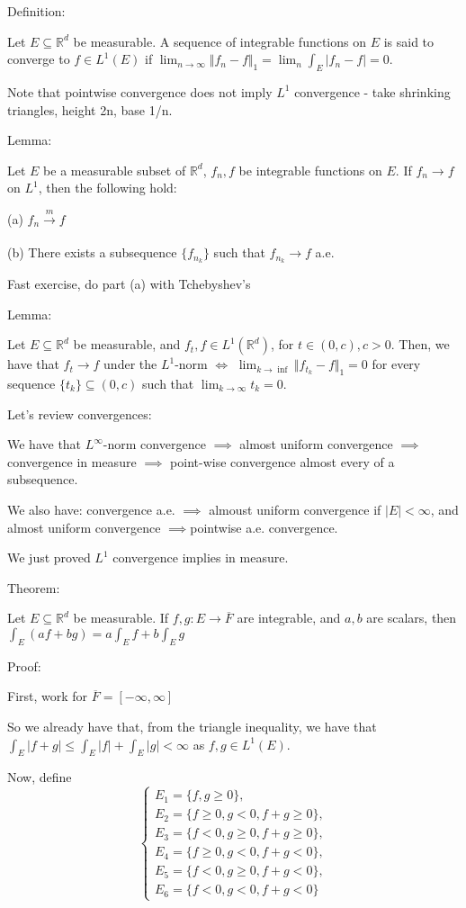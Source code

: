 \documentclass[10pt]{article}
\begin{document}
Definition:

Let $E \subseteq \mathbb{R}^d$ be measurable. A sequence of integrable functions on $E$ is said to converge to $f \in L^1(E)$ if $\lim_{n \to \infty} \Vert f_n -f \Vert_1 = \lim_n \int_E |f_n - f| = 0$.

Note that pointwise convergence does not imply $L^1$ convergence - take shrinking triangles, height 2n, base 1/n.

Lemma:

Let $E$ be a measurable subset of $\mathbb{R}^d$, $f_n,f$ be integrable functions on $E$. If $f_n \to f$ on $L^1$, then the following hold:

(a) $f_n \xrightarrow[]{m} f$

(b) There exists a subsequence $\{ f_{n_k} \}$ such that $f_{n_k} \to f$ a.e.

Fast exercise, do part (a) with Tchebyshev’s

Lemma:

Let $E \subseteq \mathbb{R}^d$ be measurable, and $f_t, f \in L^1(\mathbb{R}^d)$, for $t \in (0,c), c > 0$. Then, we have that $f_t \to f$ under the $L^1$-norm $\iff$ $\lim_{k\to\inf} \Vert f_{t_k} - f \Vert_1 = 0$ for every sequence $\{ t_k \} \subseteq (0,c)$ such that $\lim_{k \to \infty} t_k = 0$.

Let’s review convergences:

We have that $L^\infty$-norm convergence $\implies$ almost uniform convergence $\implies$ convergence in measure $\implies$ point-wise convergence almost every of a subsequence.

We also have: convergence a.e. $\implies$ almoust uniform convergence if $|E| < \infty$, and almost uniform convergence $\implies $pointwise a.e. convergence.

We just proved $L^1$ convergence implies in measure.

Theorem:

Let $E \subseteq \mathbb{R}^d$ be measurable. If $f,g: E \to \overline{F}$ are integrable, and $a,b$ are scalars, then $\int_E (af + bg) = a \int_E f + b \int_E g$

Proof:

First, work for $\overline{F} = [-\infty,\infty]$

So we already have that, from the triangle inequality, we have that $\int_E | f + g| \leq \int_E |f| + \int_E |g| < \infty$ as $f,g \in L^1(E)$.

Now, define $$ \begin{cases} E_1 = \{ f,g \geq 0 \}, \\E_2 = \{ f \geq 0, g < 0, f+g \geq 0 \}, \\E_3 = \{ f < 0, g \geq 0, f+g \geq 0 \}, \\E_4 = \{ f \geq 0, g < 0, f+g < 0 \} , \\E_5 = \{ f  < 0, g \geq 0, f+g < 0 \}, \\E_6 = \{ f < 0, g < 0, f+g < 0 \} \end{cases}$$
\end{document}
